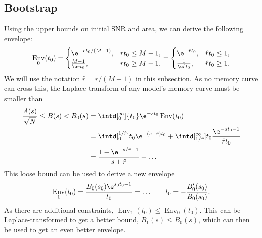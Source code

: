 \documentclass[12pt]{article}
\DeclareMathOperator{\env}{Env}
\newcommand{\rh}{\hat{r}}
\begin{document}
\subsection{Bootstrap}\label{sec:boot}

Using the upper bounds on initial SNR and area, we can derive the following envelope:
%
\begin{equation}\label{sec:envinitarea}
  \env_0(t_0) =
    \begin{cases}
    \e^{-rt_0/(M-1)},    & rt_0 \leq M-1,\\
    \frac{M-1}{\e rt_0}, & rt_0 \geq M-1.
    \end{cases}
    =
    \begin{cases}
    \e^{-\rh t_0},        & \rh t_0 \leq 1,\\
    \frac{1}{\e \rh t_0}, & \rh t_0 \geq 1.
    \end{cases}
\end{equation}
%
We will use the notation $\rh=r/(M-1)$ in this subsection.
As no memory curve can cross this, the Laplace transform of any model's memory curve must be smaller than
%
\begin{equation}\label{eq:envlt}
\begin{aligned}
  \frac{A(s)}{\sqrt{N}} \leq B(s) < B_0(s) &= \intd[_0^\infty]{t_0} \e^{-st_0}\env(t_0) \\
   &= \intd[_0^{1/\rh}]{t_0} \e^{-(s+\rh)t_0}
   + \intd[_{1/\rh}^\infty]{t_0} \frac{\e^{-st_0-1}}{\rh t_0} \\
   &= \frac{1-\e^{-s/\rh-1}}{s+\rh} + \ldots
\end{aligned}
\end{equation}
%
This loose bound can be used to derive a new envelope
%
\begin{equation}\label{eq:envb0}
  \env_1(t_0) = \frac{B_0(s_0) \e^{s_0t_0-1}}{t_0} = \ldots
  \qquad t_0 = -\frac{B_0'(s_0)}{B_0(s_0)}.
\end{equation}
%
As there are additional constraints, $\env_1(t_0) \leq \env_0(t_0)$.
This can be Laplace-transformed to get a better bound, $B_1(s) \leq B_0(s)$, which can then be used to get an even better envelope.
\end{document}

